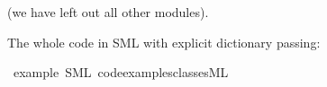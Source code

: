 \begin{isabellebody}
\begin{isamarkuptext}
  \noindent (we have left out all other modules).

  \noindent The whole code in SML with explicit dictionary passing:%
\end{isamarkuptext}%
\isamarkuptrue%
\isamarkupfalse%
\ example\ {\isacharparenleft}SML\ {\isachardoublequoteopen}code{\isacharunderscore}examples{\isacharslash}classes{\isachardot}ML{\isachardoublequoteclose}{\isacharparenright}%
\begin{isamarkuptext}%
%
\end{isamarkuptext}%
\isamarkuptrue%
%
\isadelimtheory
%
\endisadelimtheory
%
\isatagtheory
{}\isamarkupfalse%
%
\endisatagtheory
{\isafoldtheory}%
%
\isadelimtheory
%
\endisadelimtheory
\isanewline
\end{isabellebody}%
